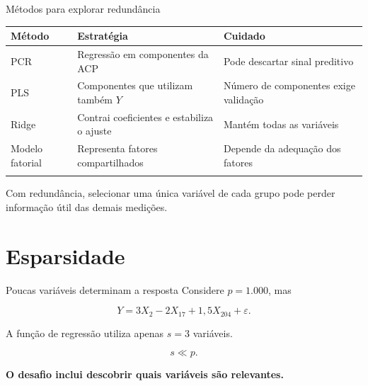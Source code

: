 \documentclass[
  10pt,
  ignorenonframetext,
  aspectratio=169,
  brazilian,
]{beamer}
\newcounter{none} %
\begin{document}
\begin{frame}{Métodos para explorar redundância}
\protect{}\label{muxe9todos-para-explorar-redunduxe2ncia}
{\def\LTcaptype{none} %
\begin{longtable}[]{@{}
  >{\raggedright\arraybackslash}p{}
  >{\raggedright\arraybackslash}p{}
  >{\raggedright\arraybackslash}p{}@{}}
\toprule\noalign{}
\begin{minipage}[b]{\linewidth}\raggedright
Método
\end{minipage} & \begin{minipage}[b]{\linewidth}\raggedright
Estratégia
\end{minipage} & \begin{minipage}[b]{\linewidth}\raggedright
Cuidado
\end{minipage} \\
\midrule\noalign{}
\endhead
PCR & Regressão em componentes da ACP & Pode descartar sinal
preditivo \\
PLS & Componentes que utilizam também \(Y\) & Número de componentes
exige validação \\
Ridge & Contrai coeficientes e estabiliza o ajuste & Mantém todas as
variáveis \\
Modelo fatorial & Representa fatores compartilhados & Depende da
adequação dos fatores \\
\bottomrule\noalign{}
\end{longtable}
}

Com redundância, selecionar uma única variável de cada grupo pode perder
informação útil das demais medições.
\end{frame}

\section{Esparsidade}\label{esparsidade}

\begin{frame}{Poucas variáveis determinam a resposta}
\protect{}\label{poucas-variuxe1veis-determinam-a-resposta}
Considere \(p=1.000\), mas

\[
Y=3X_2-2X_{17}+1{,}5X_{204}+\varepsilon.
\]

A função de regressão utiliza apenas \(s=3\) variáveis.

\[
\boxed{s\ll p.}
\]

\textbf{O desafio inclui descobrir quais variáveis são relevantes.}

\end{frame}
\end{document}
